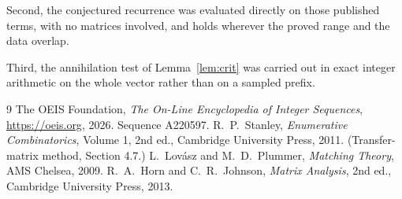 \documentclass[11pt,a4paper]{article}
\theoremstyle{plain}
\theoremstyle{definition}
\begin{document}
Second, the conjectured recurrence was evaluated directly on those published terms, with no
matrices involved, and holds wherever the proved range and the data overlap.

Third, the annihilation test of Lemma~\ref{lem:crit} was carried out in exact integer
arithmetic on the whole vector rather than on a sampled prefix.

\begin{thebibliography}{9}
 The OEIS Foundation, \emph{The On-Line Encyclopedia of Integer
Sequences}, \url{https://oeis.org}, 2026. Sequence A220597.
 R.~P.~Stanley, \emph{Enumerative Combinatorics}, Volume 1, 2nd ed.,
Cambridge University Press, 2011. (Transfer-matrix method, Section 4.7.)
 L.~Lov\'asz and M.~D.~Plummer, \emph{Matching Theory}, AMS Chelsea,
2009.
 R.~A.~Horn and C.~R.~Johnson, \emph{Matrix Analysis}, 2nd ed., Cambridge
University Press, 2013.
\end{thebibliography}
\end{document}
